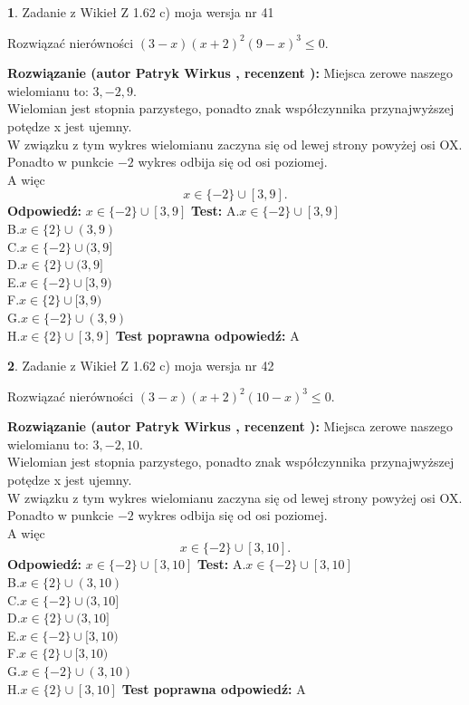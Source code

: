 \documentclass[12pt, a4paper]{article}
\theoremstyle{definition} %
\newtheorem{zad}{}
\newcommand{\zadStart}[1]{\begin{zad}#1\newline}
\newcommand{\zadStop}{\end{zad}}
\newcommand{\rozwStart}[2]{\noindent \textbf{Rozwiązanie (autor #1 , recenzent #2): }\newline}
\newcommand{\rozwStop}{\newline}
\newcommand{\odpStart}{\noindent \textbf{Odpowiedź:}\newline}
\newcommand{\odpStop}{\newline}
\newcommand{\testStart}{\noindent \textbf{Test:}\newline}
\newcommand{\testStop}{\newline}
\newcommand{\kluczStart}{\noindent \textbf{Test poprawna odpowiedź:}\newline}
\newcommand{\kluczStop}{\newline}
\begin{document}
\zadStart{Zadanie z Wikieł Z 1.62 c) moja wersja nr 41}

Rozwiązać nierówności $(3-x)(x+2)^{2}(9-x)^{3}\le0$.
\zadStop
\rozwStart{Patryk Wirkus}{}
Miejsca zerowe naszego wielomianu to: $3, -2, 9$.\\
Wielomian jest stopnia parzystego, ponadto znak współczynnika przy\linebreak najwyższej potędze x jest ujemny.\\ W związku z tym wykres wielomianu zaczyna się od lewej strony powyżej osi OX.\\
Ponadto w punkcie $-2$ wykres odbija się od osi poziomej.\\
A więc $$x \in \{-2\} \cup [3,9].$$
\rozwStop
\odpStart
$x \in \{-2\} \cup [3,9]$
\odpStop
\testStart
A.$x \in \{-2\} \cup [3,9]$\\
B.$x \in \{2\} \cup (3,9)$\\
C.$x \in \{-2\} \cup (3,9]$\\
D.$x \in \{2\} \cup (3,9]$\\
E.$x \in \{-2\} \cup [3,9)$\\
F.$x \in \{2\} \cup [3,9)$\\
G.$x \in \{-2\} \cup (3,9)$\\
H.$x \in \{2\} \cup [3,9]$
\testStop
\kluczStart
A
\kluczStop



\zadStart{Zadanie z Wikieł Z 1.62 c) moja wersja nr 42}

Rozwiązać nierówności $(3-x)(x+2)^{2}(10-x)^{3}\le0$.
\zadStop
\rozwStart{Patryk Wirkus}{}
Miejsca zerowe naszego wielomianu to: $3, -2, 10$.\\
Wielomian jest stopnia parzystego, ponadto znak współczynnika przy\linebreak najwyższej potędze x jest ujemny.\\ W związku z tym wykres wielomianu zaczyna się od lewej strony powyżej osi OX.\\
Ponadto w punkcie $-2$ wykres odbija się od osi poziomej.\\
A więc $$x \in \{-2\} \cup [3,10].$$
\rozwStop
\odpStart
$x \in \{-2\} \cup [3,10]$
\odpStop
\testStart
A.$x \in \{-2\} \cup [3,10]$\\
B.$x \in \{2\} \cup (3,10)$\\
C.$x \in \{-2\} \cup (3,10]$\\
D.$x \in \{2\} \cup (3,10]$\\
E.$x \in \{-2\} \cup [3,10)$\\
F.$x \in \{2\} \cup [3,10)$\\
G.$x \in \{-2\} \cup (3,10)$\\
H.$x \in \{2\} \cup [3,10]$
\testStop
\kluczStart
A
\kluczStop
\end{document}
